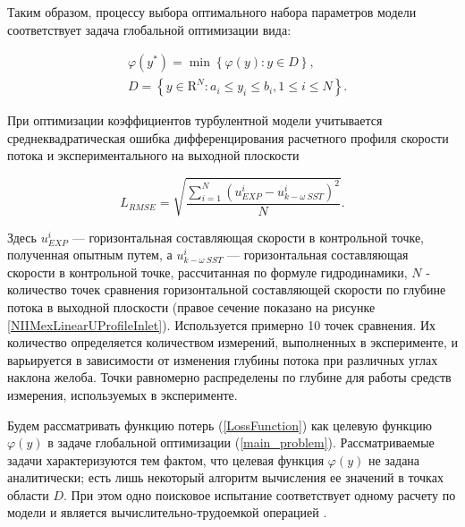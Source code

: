 \documentclass[mathematics,article,accept,pdftex,moreauthors]{Definitions/mdpi}
\begin{document}
Таким образом, процессу выбора оптимального набора параметров модели соответствует задача глобальной оптимизации вида:
\begin{linenomath}
\begin{equation}\label{main_problem}
\begin{aligned}
    & \varphi(y^\ast)=\min{\left\{\varphi(y):y\in D\right\}},\\
    & D=\left\{y\in \text{R}^N: a_i\leq y_i \leq b_i, 1\leq i \leq N\right\}.
\end{aligned}
\end{equation}
\end{linenomath}
При оптимизации коэффициентов турбулентной модели учитывается среднеквадратическая ошибка дифференцирования расчетного профиля скорости потока и экспериментального на выходной плоскости 
\begin{linenomath}
\begin{equation}
	\label{LossFunction}
	 {L_{RMSE}} = \sqrt{\frac{\sum\limits_{i=1}^{N} \left( u_{EXP}^i - u_{k-\omega\ SST}^i \right)^2}{N}}.
\end{equation}
\end{linenomath}

Здесь $u_{EXP}^i$ — горизонтальная составляющая скорости в контрольной точке, полученная опытным путем, а $u_{k-\omega\ SST}^i$ — горизонтальная составляющая скорости в контрольной точке, рассчитанная по формуле гидродинамики, $N$ - количество точек сравнения горизонтальной составляющей скорости по глубине потока в выходной плоскости (правое сечение показано на рисунке \ref{NIIMexLinearUProfileInlet}). Используется примерно 10 точек сравнения. Их количество определяется количеством измерений, выполненных в эксперименте, и варьируется в зависимости от изменения глубины потока при различных углах наклона желоба. Точки равномерно распределены по глубине для работы средств измерения, используемых в эксперименте.


Будем рассматривать функцию потерь (\ref{LossFunction}) как целевую функцию $\varphi(y)$ в задаче глобальной оптимизации (\ref{main_problem}). Рассматриваемые задачи характеризуются тем фактом, что целевая функция $\varphi(y)$ не задана аналитически; есть лишь некоторый алгоритм вычисления ее значений в точках области $D$. При этом одно поисковое испытание соответствует одному расчету по модели и является вычислительно-трудоемкой операцией \cite{Kalyulin2017,Paulavicius2020}.
\end{document}
